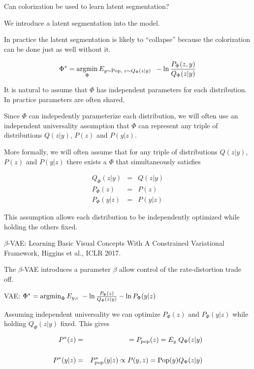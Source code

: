{\vfill
Can colorization be used to learn latent segmentation?

\vfill
We introduce a latent segmentation into the model.

\vfill
In practice the latent segmentation is likely to ``collapse'' because the colorization can be done just as well without it.



$$\Phi^* = \operatorname*{argmin}_\Phi E_{y\sim \mathrm{Pop},\;z \sim Q_\Phi(z|y)}\;\;-\ln \frac{P_\Phi(z,y)}{Q_\Phi(z|y)}$$

\vfill
It is natural to assume  that $\Phi$ has independent parameters for each distribution.  In practice parameters are often shared.

\vfill
Since $\Phi$ can indepedently parameterize each distribution, we will often use an independent universality assumption
that $\Phi$ can represent any triple of distributions $Q(z|y)$, $P(z)$ and $P(y|z)$.



More formally, we will often assume that for any triple of distributions $Q(z|y)$, $P(z)$ and $P(y|z)$ there exists a $\Phi$ that {\color{red} simultaneously} satisfies

\begin{eqnarray*}
Q_\Phi(z|y) & = & Q(z|y) \\
P_\Phi(z) & = & P(z) \\
P_\Phi(y|z) & = & P(y|z)
\end{eqnarray*}

\vfill
This assumption allows each distribution to be independently optimized while holding the others fixed.


$\beta$-VAE: Learning Basic Visual Concepts With A
Constrained Variational Framework, Higgins et al., ICLR 2017.

\vfill
The $\beta$-VAE introduces a parameter $\beta$ allow control of the rate-distortion trade off.


VAE: $\Phi^* = \operatorname*{argmin}_\Phi E_{y,\epsilon}\;-\ln \frac{P_\Phi(z)}{Q_\Phi(z|y)} - \ln P_\Phi(y|z)$

\vfill
Assuming independent universality we can optimize $P_\Phi(z)$ and $P_\Phi(y|z)$ while holding $Q_\Phi(z|y)$ fixed.
This gives

\begin{eqnarray*}
P^*(z) & = & = P_{\mathrm{pop}}(z) = E_y \;Q_\Phi(z|y) \\
\\
P^*(y|z) & = & P^*_{\mathrm{pop}}(y|z) \propto P(y,z) = \mathrm{Pop}(y)Q_\Phi(z|y)
\end{eqnarray*}

}
